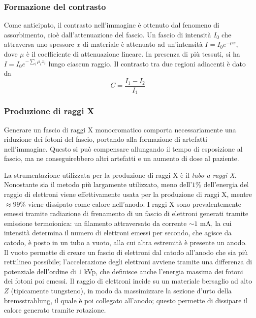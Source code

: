 \documentclass[11pt, a4paper]{scrartcl}
\theoremstyle{style}
\theoremstyle{style1}
\numberwithin{equation}{subsection}
\begin{document}
\subsubsection{Formazione del contrasto}

Come anticipato, il contrasto nell'immagine \`e ottenuto dal fenomeno di assorbimento, cio\`e dall'attenuazione del fascio.
Un fascio di intensit\`a $I_0$ che attraversa uno spessore $x$ di materiale \`e attenuato ad un'intensit\`a $I = I_0 e^{-\mu  x}$, dove $\mu $ \`e il coefficiente di attenuazione lineare.
In presenza di pi\`u tessuti, si ha $I = I_0 e^{- \sum_{i}^{} \mu _i x_i}$ lungo ciascun raggio.
Il contrasto tra due regioni adiacenti \`e dato da 
\begin{equation}
C = \frac{I_1 - I_2}{I_1}
\end{equation}

\subsubsection{Produzione di raggi X}

Generare un fascio di raggi X monocromatico comporta necessariamente una riduzione dei fotoni del fascio, portando alla formazione di artefatti nell'immagine.
Questo si pu\`o compensare allungando il tempo di esposizione al fascio, ma ne conseguirebbero altri artefatti e un aumento di dose al paziente.

La strumentazione utilizzata per la produzione di raggi X \`e il \textit{tubo a raggi X}.
Nonostante sia il metodo pi\`u largamente utilizzato, meno dell'$1\%$ dell'energia del raggio di elettroni viene effettivamente usata per la produzione di raggi X, mentre $\approx 99\%$ viene dissipato come calore nell'anodo.
I raggi X sono prevalentemente emessi tramite radiazione di frenamento di un fascio di elettroni generati tramite emissione termoionica: un filamento attraversato da corrente $\sim 1$ mA, la cui intensit\`a determina il numero di elettroni emessi per secondo, che agisce da catodo, \`e posto in un tubo a vuoto, alla cui altra estremit\`a \`e presente un anodo.
Il vuoto permette di creare un fascio di elettroni dal catodo all'anodo che sia pi\`u rettilineo possibile; l'accelerazione degli elettroni avviene tramite una differenza di potenziale dell'ordine di $1$ kVp, che definisce anche l'energia massima dei fotoni dei fotoni poi emessi.
Il raggio di elettroni incide su un materiale bersaglio ad alto $Z$ (tipicamente tungsteno), in modo da massimizzare la sezione d'urto della bremsstrahlung, il quale \`e poi collegato all'anodo; questo permette di dissipare il calore generato tramite rotazione.
\end{document}
